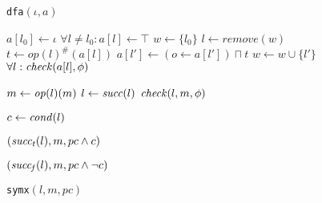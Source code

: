 \begin{figure}[t]
\noindent\begin{minipage}[t]{0.4\textwidth}
\begin{algorithm}[H]
\renewcommand{\algorithmicindent}{0.6em}
\caption{{\tt dfa}$(\iota,a)$}
\label{alg-dfa}
\begin{algorithmic}
 \STATE $a[l_0] \gets \iota$
 \STATE $\forall l \not= l_0 : a[l] \gets \top$
 \STATE $w \gets \{l_0\}$
   \STATE $l \gets remove(w)$
   \STATE $t \gets {op(l)}^{\#}(a[l])$
     \STATE $a[l'] \gets (o \gets a[l']) \sqcap t$
       \STATE $w \gets w \cup \{l'\}$
     \ENDIF
   \ENDFOR
 \ENDWHILE
 \STATE $\forall l : \mathit{check}(a[l],\phi)$
\end{algorithmic}
\end{algorithm}
\end{minipage}%
\hfill
\begin{minipage}[t]{0.4\textwidth}
\begin{algorithm}[H]
\renewcommand{\algorithmicindent}{0.6em}
\caption{{\tt symx}$(l,m,pc)$}
\label{alg-symexe}
\begin{algorithmic}
 \RETURN
 \ENDIF
   \STATE $m \gets \mathit{op}(l)(m)$
   \STATE $l \gets \mathit{succ}(l)$
   \STATE $\mathit{check}(l,m,\phi)$
 \ENDWHILE

 \STATE $c \gets \mathit{cond}(l)$

   $(\mathit{succ_t}(l), m, pc \wedge c)$
 \ENDIF

   $(\mathit{succ_f}(l), m, pc \wedge \neg c)$
 \ENDIF
\end{algorithmic}
\end{algorithm}
\end{minipage}
\end{figure}

